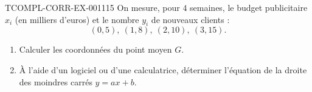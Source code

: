 \begin{exercice}{TCOMPL-CORR-EX-001}{1}{15}
On mesure, pour $4$ semaines, le budget publicitaire $x_i$ (en milliers d'euros) et le nombre $y_i$ de nouveaux clients :
\[
  (0,5),\ (1,8),\ (2,10),\ (3,15).
\]
\begin{enumerate}
  \item Calculer les coordonnées du point moyen $G$.
  \item À l'aide d'un logiciel ou d'une calculatrice, déterminer l'équation de la droite des moindres carrés $y=ax+b$.
\end{enumerate}
\end{exercice}

